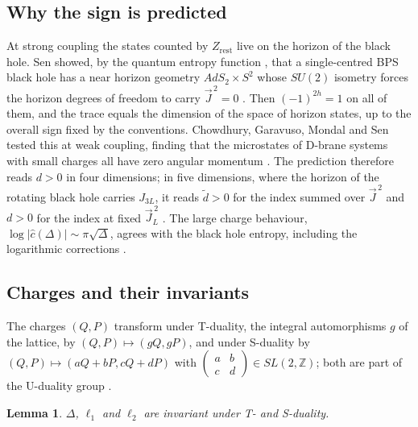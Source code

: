 \documentclass[11pt]{amsart}
\newtheorem{lemma}[theorem]{Lemma}
\theoremstyle{definition}
\newcommand{\ZZ}{\mathbb{Z}}
\newcommand{\cc}{\hat c}
\newcommand{\dt}{\tilde d}
\begin{document}
\subsection{Why the sign is predicted}
At strong coupling the states counted by $Z_{\mathrm{rest}}$ live on the horizon of the black hole. Sen showed, by the quantum entropy function \cite{Sen09a,Sen09b}, that a single-centred BPS black hole has a near horizon geometry $AdS_2\times S^2$ whose $SU(2)$ isometry forces the horizon degrees of freedom to carry $\vec J^{\,2}=0$ \cite{Sen11,DGMS11}. Then $(-1)^{2h}=1$ on all of them, and the trace equals the dimension of the space of horizon states, up to the overall sign fixed by the conventions. Chowdhury, Garavuso, Mondal and Sen tested this at weak coupling, finding that the microstates of D-brane systems with small charges all have zero angular momentum \cite{CGMS14,CGMS16}. The prediction therefore reads $d>0$ in four dimensions; in five dimensions, where the horizon of the rotating black hole carries $J_{3L}$, it reads $\dt>0$ for the index summed over $\vec J^{\,2}$ and $d>0$ for the index at fixed $\vec J_L^{\,2}$ \cite{Sen12}. The large charge behaviour, $\log|\cc(\Delta)|\sim\pi\sqrt\Delta$, agrees with the black hole entropy, including the logarithmic corrections \cite{Sen12,DGM11}.

\subsection{Charges and their invariants}\label{ssec:charges}
The charges $(Q,P)$ transform under T-duality, the integral automorphisms $g$ of the lattice, by $(Q,P)\mapsto(gQ,gP)$, and under S-duality by $(Q,P)\mapsto(aQ+bP,cQ+dP)$ with $\left(\begin{smallmatrix}a&b\\c&d\end{smallmatrix}\right)\in SL(2,\ZZ)$; both are part of the U-duality group \cite{CJ79,Sen10}.

\begin{lemma}\label{lem:invariants}
$\Delta$, $\ell_1$ and $\ell_2$ are invariant under T- and S-duality.
\end{lemma}
\end{document}
